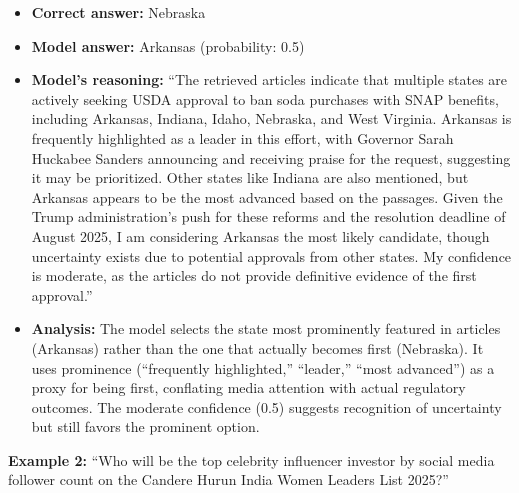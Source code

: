\begin{itemize}
\item \textbf{Correct answer:} Nebraska
\item \textbf{Model answer:} Arkansas (probability: 0.5)
\item \textbf{Model's reasoning:} ``The retrieved articles indicate that multiple states are actively seeking USDA approval to ban soda purchases with SNAP benefits, including Arkansas, Indiana, Idaho, Nebraska, and West Virginia. Arkansas is frequently highlighted as a leader in this effort, with Governor Sarah Huckabee Sanders announcing and receiving praise for the request, suggesting it may be prioritized. Other states like Indiana are also mentioned, but Arkansas appears to be the most advanced based on the passages. Given the Trump administration's push for these reforms and the resolution deadline of August 2025, I am considering Arkansas the most likely candidate, though uncertainty exists due to potential approvals from other states. My confidence is moderate, as the articles do not provide definitive evidence of the first approval.''
\item \textbf{Analysis:} The model selects the state most prominently featured in articles (Arkansas) rather than the one that actually becomes first (Nebraska). It uses prominence (``frequently highlighted,'' ``leader,'' ``most advanced'') as a proxy for being first, conflating media attention with actual regulatory outcomes. The moderate confidence (0.5) suggests recognition of uncertainty but still favors the prominent option.
\end{itemize}

\textbf{Example 2:} ``Who will be the top celebrity influencer investor by social media follower count on the Candere Hurun India Women Leaders List 2025?''

